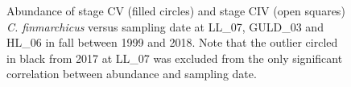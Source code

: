 \documentclass[12pt]{article}\usepackage[]{graphicx}\usepackage[]{color}
\begin{document}
\begin{figure}[htb]

{\centering {} 

}

\caption{Abundance of stage CV (filled circles) and stage CIV (open squares) \emph{C. finmarchicus} versus sampling date at LL\_07, GULD\_03 and HL\_06 in fall between 1999 and 2018. Note that the outlier circled in black from 2017 at LL\_07 was excluded from the only significant correlation between abundance and sampling date.}\label{fig:figure34}
\end{figure}
\clearpage
\end{document}
